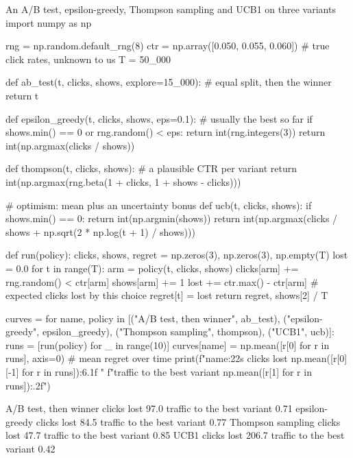 \begin{pylisting}[label={lst:bandits}]{An A/B test, epsilon-greedy, Thompson sampling and UCB1 on three variants}
import numpy as np

rng = np.random.default_rng(8)
ctr = np.array([0.050, 0.055, 0.060])              # true click rates, unknown to us
T = 50_000

def ab_test(t, clicks, shows, explore=15_000):     # equal split, then the winner
    return t %

def epsilon_greedy(t, clicks, shows, eps=0.1):     # usually the best so far
    if shows.min() == 0 or rng.random() < eps:
        return int(rng.integers(3))
    return int(np.argmax(clicks / shows))

def thompson(t, clicks, shows):                    # a plausible CTR per variant
    return int(np.argmax(rng.beta(1 + clicks, 1 + shows - clicks)))

# optimism: mean plus an uncertainty bonus
def ucb(t, clicks, shows):
    if shows.min() == 0:
        return int(np.argmin(shows))
    return int(np.argmax(clicks / shows + np.sqrt(2 * np.log(t + 1) / shows)))

def run(policy):
    clicks, shows, regret = np.zeros(3), np.zeros(3), np.empty(T)
    lost = 0.0
    for t in range(T):
        arm = policy(t, clicks, shows)
        clicks[arm] += rng.random() < ctr[arm]
        shows[arm] += 1
        lost += ctr.max() - ctr[arm]               # expected clicks lost by this choice
        regret[t] = lost
    return regret, shows[2] / T

curves = {}
for name, policy in [("A/B test, then winner", ab_test),
                     ("epsilon-greedy", epsilon_greedy), ("Thompson sampling", thompson),
                     ("UCB1", ucb)]:
    runs = [run(policy) for _ in range(10)]
    curves[name] = np.mean([r[0] for r in runs], axis=0)      # mean regret over time
    print(f"{name:22s} clicks lost {np.mean([r[0][-1] for r in runs]):6.1f}   "
          f"traffic to the best variant {np.mean([r[1] for r in runs]):.2f}")
\end{pylisting}
\begin{pyoutput}
A/B test, then winner  clicks lost   97.0   traffic to the best variant 0.71
epsilon-greedy         clicks lost   84.5   traffic to the best variant 0.77
Thompson sampling      clicks lost   47.7   traffic to the best variant 0.85
UCB1                   clicks lost  206.7   traffic to the best variant 0.42
\end{pyoutput}

